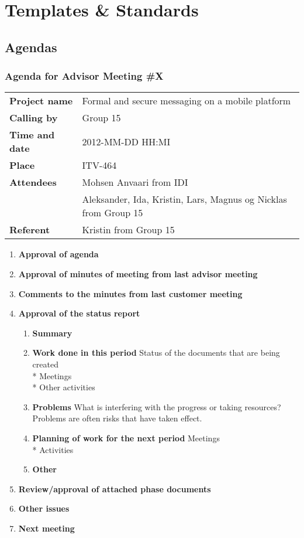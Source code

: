 \chapter{Templates \& Standards}

\section{Agendas}

\subsection{Agenda for Advisor Meeting \#X}

\begin{tabular}{>{\bfseries}l l}	
Project name&Formal and secure messaging on a mobile platform\\
Calling by&Group 15\\
Time and date&2012-MM-DD HH:MI\\
Place&ITV-464\\
Attendees&Mohsen Anvaari from IDI\\
 & Aleksander, Ida, Kristin, Lars, Magnus og Nicklas from Group 15\\
Referent&Kristin from Group 15\\
\end{tabular}

\begin{enumerate}
\item{}\textbf{Approval of agenda}
\item{}\textbf{Approval of minutes of meeting from last advisor meeting}
\item{}\textbf{Comments to the minutes from last customer meeting}
\item{}\textbf{Approval of the status report}
\begin{enumerate}
\item{}\textbf{Summary}
\item{}\textbf{Work done in this period}
Status of the documents that are being created\\*
Meetings\\*
Other activities
\item{}\textbf{Problems}
What is interfering with the progress or taking resources? Problems are often risks that have taken effect.
\item{}\textbf{Planning of work for the next period}
Meetings\\*
Activities
\item{}\textbf{Other}
\end{enumerate}
\item{}\textbf{Review/approval of attached phase documents}
\item{}\textbf{Other issues}
\item{}\textbf{Next meeting}
\end{enumerate}